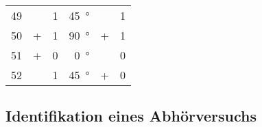 \begin{longtable}[c]{rccrcc}
	49\hspace{1.5em} & \times & 1 & \qty{ 45}{\degree}\hspace{1.5em} & \times & 1 \\
	50\hspace{1.5em} &      + & 1 & \qty{ 90}{\degree}\hspace{1.5em} &      + & 1 \\
	51\hspace{1.5em} &      + & 0 & \qty{  0}{\degree}\hspace{1.5em} & \times & 0 \\
	52\hspace{1.5em} & \times & 1 & \qty{ 45}{\degree}\hspace{1.5em} &      + & 0 \\
	\bottomrule
\end{longtable}

\subsection{Identifikation eines Abhörversuchs}

